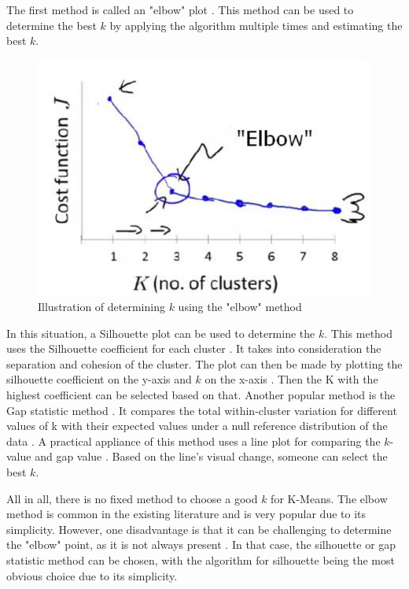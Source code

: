 The first method is called an "elbow" plot \citep{kodinariya_review_2013}.
This method can be used to determine the best $k$ by applying the algorithm multiple times and estimating the best $k$.
\begin{figure}[H]
  \includegraphics{TheorethicalFramework/dentification-of-Elbow-point.png}
  \caption{Illustration of determining $k$ using the "elbow" method \citep{kodinariya_review_2013}}
\end{figure}
In this situation, a Silhouette plot can be used to determine the $k$.
This method uses the Silhouette coefficient for each cluster \citep{saputra_effect_2020}.
It takes into consideration the separation and cohesion of the cluster.
The plot can then be made by plotting the silhouette coefficient on the y-axis and $k$ on the x-axis \citep{saputra_effect_2020}.
Then the K with the highest coefficient can be selected based on that. \newline
Another popular method is the Gap statistic method \citep{yuan_research_2019}.
It compares the total within-cluster variation for different values of k with their expected values under a null reference distribution of the data \citep{tibshirani_estimating_2001}.
A practical appliance of this method uses a line plot for comparing the $k$-value and gap value \citep{yuan_research_2019}.
Based on the line's visual change, someone can select the best $k$.

All in all, there is no fixed method to choose a good $k$ for K-Means.
The elbow method is common in the existing literature and is very popular due to its simplicity.
However, one disadvantage is that it can be challenging to determine the "elbow" point, as it is not always present \citep{kodinariya_review_2013}.
In that case, the silhouette or gap statistic method can be chosen, with the algorithm for silhouette being the most obvious choice due to its simplicity.
